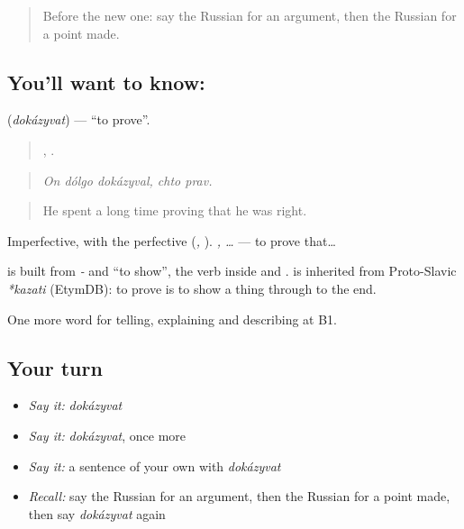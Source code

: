 \label{lesson:RU-C338-dokazyvat}



\begin{quote}
Before the new one: say the Russian for an argument, then the Russian for a point made.
\end{quote}

\subsection*{You'll want to know: }
\textbf{} (\emph{dokázyvat}) — \textquotedblleft{}to prove\textquotedblright{}.

\begin{quote}
  ,  .
\end{quote}

\begin{quote}
\emph{On dólgo dokázyval, chto prav.}
\end{quote}

\begin{quote}
He spent a long time proving that he was right.
\end{quote}

Imperfective, with the perfective \emph{} (\emph{, }). \emph{, …} — to prove that…

\begin{cousinweb}
\textbf{} is built from \emph{-} and \emph{} \textquotedblleft{}to show\textquotedblright{}, the verb inside \emph{} and \emph{}. \emph{} is inherited from Proto-Slavic \emph{*kazati} (EtymDB): to prove is to show a thing through to the end.
\end{cousinweb}

\begin{grammarlens}[title={What you've built}]
One more word for telling, explaining and describing at B1.
\end{grammarlens}

\subsection*{Your turn}
\begin{itemize}
\raggedright
  \item \emph{Say it:} \emph{dokázyvat}
  \item \emph{Say it:} \emph{dokázyvat}, once more
  \item \emph{Say it:} a sentence of your own with \emph{dokázyvat}
  \item \emph{Recall:} say the Russian for an argument, then the Russian for a point made, then say \emph{dokázyvat} again
\end{itemize}

